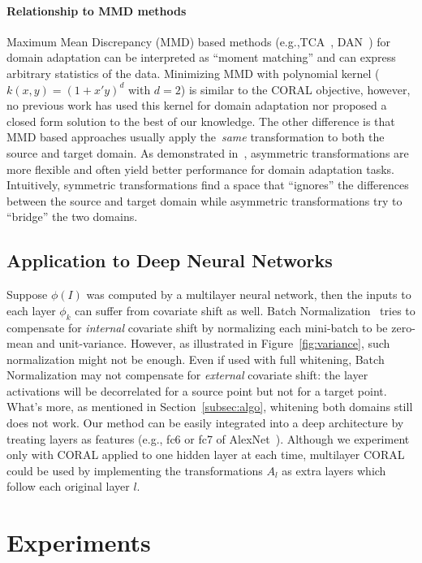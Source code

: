 \documentclass[letterpaper]{article}
\begin{document}
\paragraph{Relationship to MMD methods}
Maximum Mean Discrepancy (MMD) based methods (e.g.,TCA~\cite{tca}, DAN~\cite{dan_long15}) for domain adaptation can be interpreted as ``moment matching'' and can express arbitrary statistics of the data. Minimizing MMD with polynomial kernel ($k(x,y) = (1+x'y)^d$ with $d=2$) is similar to the CORAL objective, however, no previous work has used this kernel for domain adaptation nor proposed a closed form solution to the best of our knowledge. 
The other difference is that MMD based approaches usually apply the~\emph{same} transformation to both the source and target domain.  As demonstrated in~\cite{ref:kulis_cvpr11,outlooks,sasb}, asymmetric transformations are more flexible and often yield better performance for domain adaptation tasks. Intuitively, symmetric transformations find a space that ``ignores'' the differences between the source and target domain while asymmetric transformations try to ``bridge'' the two domains.

\subsection{Application to Deep Neural Networks} 
Suppose $\phi(I)$ was computed by a multilayer neural network, then the inputs to each layer $\phi_k$ can suffer from covariate shift as well. Batch Normalization~\cite{batchnorm} tries to compensate for \emph{internal} covariate shift by normalizing each mini-batch to be zero-mean and unit-variance. However, as illustrated in Figure~\ref{fig:variance}, such normalization might not be enough. Even if used with full whitening, Batch Normalization may not compensate for \emph{external} covariate shift: the layer activations will be decorrelated for a source point but not for a target point. What's more, as mentioned in Section~\ref{subsec:algo}, whitening both domains still does not work. Our method can be easily integrated into a deep architecture by treating layers as features (e.g., fc6 or fc7 of AlexNet~\cite{alexnet}). Although we experiment only with CORAL applied to one hidden layer at each time, multilayer CORAL could be used by implementing the transformations $A_l$ as extra layers which follow each original layer $l$.
\section{Experiments}
\label{sec:exp}
\end{document}
